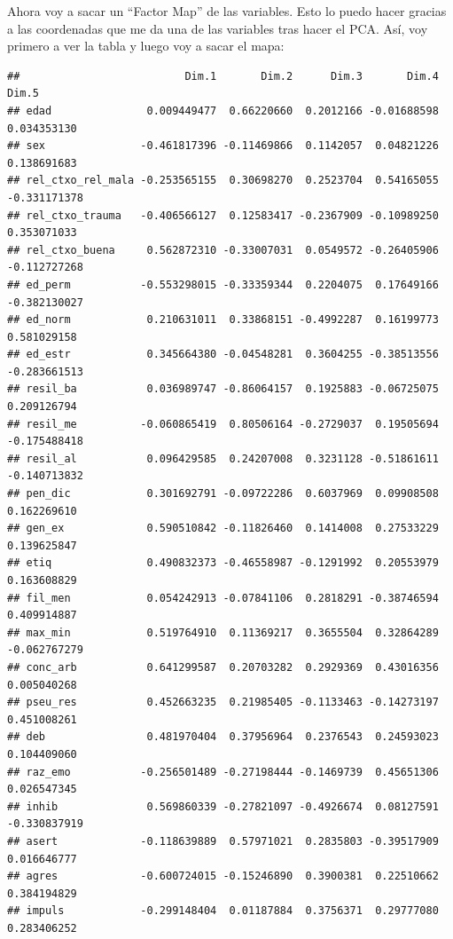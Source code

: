 \documentclass[]{article}
\newenvironment{Shaded}{\begin{snugshade}}{\end{snugshade}}
\newcommand{\NormalTok}[1]{#1}
\newcommand{\OperatorTok}[1]{\textcolor[rgb]{0.81,0.36,0.00}{\textbf{#1}}}
\begin{document}
Ahora voy a sacar un ``Factor Map'' de las variables. Esto lo puedo
hacer gracias a las coordenadas que me da una de las variables tras
hacer el PCA. Así, voy primero a ver la tabla y luego voy a sacar el
mapa:

\begin{Shaded}
\end{Shaded}

\begin{verbatim}
##                          Dim.1       Dim.2      Dim.3       Dim.4        Dim.5
## edad               0.009449477  0.66220660  0.2012166 -0.01688598  0.034353130
## sex               -0.461817396 -0.11469866  0.1142057  0.04821226  0.138691683
## rel_ctxo_rel_mala -0.253565155  0.30698270  0.2523704  0.54165055 -0.331171378
## rel_ctxo_trauma   -0.406566127  0.12583417 -0.2367909 -0.10989250  0.353071033
## rel_ctxo_buena     0.562872310 -0.33007031  0.0549572 -0.26405906 -0.112727268
## ed_perm           -0.553298015 -0.33359344  0.2204075  0.17649166 -0.382130027
## ed_norm            0.210631011  0.33868151 -0.4992287  0.16199773  0.581029158
## ed_estr            0.345664380 -0.04548281  0.3604255 -0.38513556 -0.283661513
## resil_ba           0.036989747 -0.86064157  0.1925883 -0.06725075  0.209126794
## resil_me          -0.060865419  0.80506164 -0.2729037  0.19505694 -0.175488418
## resil_al           0.096429585  0.24207008  0.3231128 -0.51861611 -0.140713832
## pen_dic            0.301692791 -0.09722286  0.6037969  0.09908508  0.162269610
## gen_ex             0.590510842 -0.11826460  0.1414008  0.27533229  0.139625847
## etiq               0.490832373 -0.46558987 -0.1291992  0.20553979  0.163608829
## fil_men            0.054242913 -0.07841106  0.2818291 -0.38746594  0.409914887
## max_min            0.519764910  0.11369217  0.3655504  0.32864289 -0.062767279
## conc_arb           0.641299587  0.20703282  0.2929369  0.43016356  0.005040268
## pseu_res           0.452663235  0.21985405 -0.1133463 -0.14273197  0.451008261
## deb                0.481970404  0.37956964  0.2376543  0.24593023  0.104409060
## raz_emo           -0.256501489 -0.27198444 -0.1469739  0.45651306  0.026547345
## inhib              0.569860339 -0.27821097 -0.4926674  0.08127591 -0.330837919
## asert             -0.118639889  0.57971021  0.2835803 -0.39517909  0.016646777
## agres             -0.600724015 -0.15246890  0.3900381  0.22510662  0.384194829
## impuls            -0.299148404  0.01187884  0.3756371  0.29777080  0.283406252
\end{verbatim}
\end{document}
